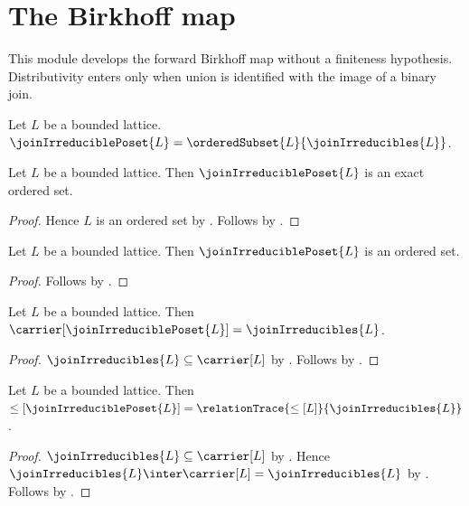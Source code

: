 \section{The Birkhoff map}







This module develops the forward Birkhoff map without a finiteness
hypothesis.  Distributivity enters only when union is identified with the
image of a binary join.

\begin{definition}\label{join_irreducible_poset}
    Let $L$ be a bounded lattice.
    $\joinIrreduciblePoset{L}
        =\orderedSubset{L}{\joinIrreducibles{L}}$.
\end{definition}

\begin{theorem}\label{join_irreducible_poset_is_exact_ordered_set}
    Let $L$ be a bounded lattice.
    Then $\joinIrreduciblePoset{L}$ is an exact ordered set.
\end{theorem}
\begin{proof}
    Hence $L$ is an ordered set by .
    Follows by
        .
\end{proof}

\begin{classification}\label{join_irreducible_poset_is_ordered_set}
    Let $L$ be a bounded lattice.
    Then $\joinIrreduciblePoset{L}$ is an ordered set.
\end{classification}
\begin{proof}
    Follows by .
\end{proof}

\begin{proposition}\label{join_irreducible_poset_carrier}
    Let $L$ be a bounded lattice.
    Then $\carrier[\joinIrreduciblePoset{L}]=\joinIrreducibles{L}$.
\end{proposition}
\begin{proof}
    $\joinIrreducibles{L}\subseteq\carrier[L]$ by
        .
    Follows by
        .
\end{proof}

\begin{proposition}\label{join_irreducible_poset_order}
    Let $L$ be a bounded lattice.
    Then $\leq[\joinIrreduciblePoset{L}]
        =\relationTrace{\leq[L]}{\joinIrreducibles{L}}$.
\end{proposition}
\begin{proof}
    $\joinIrreducibles{L}\subseteq\carrier[L]$ by
        .
    Hence $\joinIrreducibles{L}\inter\carrier[L]
        =\joinIrreducibles{L}$ by
        .
    Follows by
        .
\end{proof}

